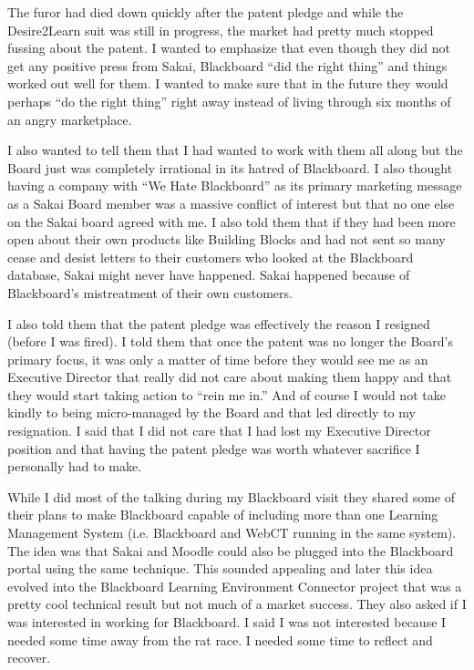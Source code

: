 \documentclass[12pt]{book}
\begin{document}
The furor had died down quickly after the patent
pledge and while the Desire2Learn suit was still in progress,
the market had pretty much stopped fussing about the patent.   I wanted to emphasize that
even though they did not get any positive press from Sakai, Blackboard ``did the right thing''
and things worked out well for them.   I wanted to make sure that in the future they would
perhaps ``do the right thing'' right away instead of living through six months of an angry
marketplace.

I also wanted to tell them that I had wanted to work with them all along but the Board
just was completely irrational in its hatred of Blackboard.  I also thought having a company
with ``We Hate Blackboard'' as its primary marketing message as a Sakai Board member was
a massive conflict of interest but that no one else on the Sakai board agreed with me.
I also told them that if they had been more open about their own products like
Building Blocks and had not sent so many cease and desist letters to their customers who
looked at the Blackboard database, Sakai might never have happened.   Sakai happened
because of Blackboard's mistreatment of their own customers.

I also told them that the patent pledge was effectively the reason I resigned (before
I was fired).   I told them that once the patent was no longer the Board's primary focus,
it was only a matter of time before they would see me as an Executive Director that really
did not care about making them happy and that they would start taking action to
``rein me in.''  And of course I would not take kindly to being micro-managed by the Board
and that led directly to my resignation.  I said that I did not care that I had
lost my Executive Director position and that having the patent pledge was worth whatever sacrifice
I personally had to make.

While I did most of the talking during my Blackboard visit they shared some of their plans to
make Blackboard capable of including more than one Learning Management System (i.e. Blackboard
and WebCT running in the same system).  The idea was that Sakai and Moodle could also
be plugged into the Blackboard portal using the same technique.   This sounded appealing
and later this idea evolved into the Blackboard Learning Environment Connector
project that was a pretty cool
technical result but not much of a market success.  They also asked if I was interested
in working for Blackboard.   I said I was not interested because I needed some time away
from the rat race.   I needed some time to reflect and recover.
\end{document}
